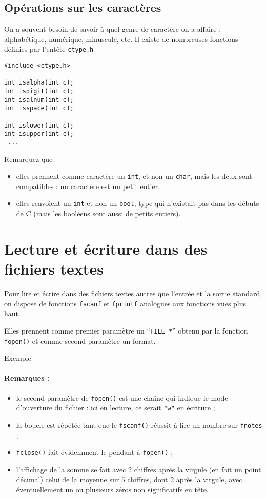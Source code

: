 \documentclass[10pt]{article}
\begin{document}
\subsection{Opérations sur les caractères}

On a souvent besoin de savoir
à quel genre de caractère on a affaire : alphabétique, numérique,
minuscule, etc. Il existe de nombreuses fonctions définies par 
l'entête \texttt{ctype.h}

\begin{verbatim}
#include <ctype.h>

int isalpha(int c);
int isdigit(int c);
int isalnum(int c);
int isspace(int c);

int islower(int c);
int isupper(int c);
 ...
\end{verbatim}

Remarquez que
\begin{itemize}
\item elles prennent comme caractère un \texttt{int}, et non un \texttt{char},
mais les deux sont compatibles : un caractère est un petit entier.
\item elles renvoient un \texttt{int} et non un \texttt{bool}, type qui n'existait pas dans les débuts de C (mais les booléens sont aussi de petits entiers).
\end{itemize}


\section{Lecture et écriture dans des fichiers textes}

Pour lire et écrire dans des fichiers textes autres que l'entrée et la sortie
standard, on dispose de fonctions
\texttt{fscanf} et \texttt{fprintf} analogues aux fonctions vues plus haut.

Elles prennent comme premier paramètre un ``\texttt{FILE *}'' obtenu par
la fonction \texttt{fopen()} et comme second paramètre un format. 


Exemple
 

\paragraph{Remarques : }
\begin{itemize}
\item le second paramètre de \texttt{fopen()} est une chaîne qui 
indique le mode d'ouverture du fichier : ici en lecture, ce serait \texttt{"w"} en écriture ;
\item la boucle est répétée tant que le \texttt{fscanf()} réussit à lire un
nombre sur \texttt{fnotes} ; 
\item \texttt{fclose()} fait évidemment le pendant à \texttt{fopen()} ;
\item l'affichage de la somme se fait avec 2 chiffres après la virgule (en fait un point décimal)
celui de la moyenne sur 5 chiffres, dont 2 après la virgule, avec éventuellement
un ou plusieurs zéros non significatifs en tête.
\end{itemize}
\end{document}
